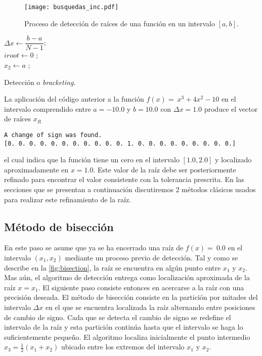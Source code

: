 \begin{figure}[H]
\centering
\texttt{[image: busquedas\_inc.pdf]}
\caption{Proceso de detección de raíces de una función en un intervalo $[a,b]$.}
\label{fig:bracketing}
\end{figure}


\begin{algorithm}[H]
\SetAlgoLined
{}
\BlankLine

$\Delta x \leftarrow \dfrac{b - a}{N - 1}$;\\
\BlankLine
$iroot \leftarrow 0$ ;\\
\BlankLine
$x_2 \leftarrow a$ ;\\
\BlankLine
{}
\BlankLine
\caption{Detección o \textit{bracketing}.}
\label{alg:brack}
%
\end{algorithm}

La aplicación del código anterior a la función $f(x) = \ x^3 + 4x^2 - 10$ en el 
intervalo comprendido entre $a=-10.0$ y $b=10.0$ con $\Delta x = 1.0$ produce 
el vector de raíces $x_R$
\begin{verbatim}
A change of sign was found.
[0. 0. 0. 0. 0. 0. 0. 0. 0. 0. 0. 1. 0. 0. 0. 0. 0. 0. 0. 0. 0.]
\end{verbatim}
el cual indica que la función tiene un cero en el intervalo $[1.0,2.0]$ y 
localizado aproximadamente en $x = 1.0$. Este valor de la raíz debe ser 
posteriormente refinado para encontrar el valor consistente con la tolerancia 
prescrita. En las secciones que se presentan a continuación discutiremos 2 
métodos clásicos usados para realizar este refinamiento de la raíz.


\subsection{Método de bisección}
En este paso se asume que ya se ha encerrado una raíz de $f(x) = \ 0.0$ en el intervalo $(x_1, x_2)$ mediante un proceso previo de detección.  Tal y como se describe en la \cref{fig:bisection}, la raíz se encuentra en algún punto entre $x_1$ y $x_2$. Mas aún, el algoritmo de detección entrega como localización aproximada de la raíz $x = x_1$. El siguiente paso consiste entonces en acercarse a la raíz con una precisión deseada. El método de bisección consiste en la partición por mitades del intervalo $\Delta x$ en el que se encuentra localizada la raíz alternando entre posiciones de cambio de signo. Cada que se detecta el cambio de signo se redefine el intervalo de la raíz y esta partición continúa hasta que el intervalo se haga lo suficientemente pequeño. El algoritmo localiza inicialmente el punto intermedio ${x_3} = \frac{1}{2}(x_1 + x_2)$ ubicado entre los extremos del intervalo $x_1$ y $x_2$.

